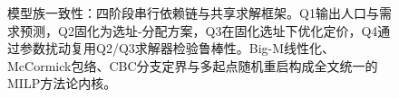 \begin{figure}[H]
{%
}
\caption{模型族一致性：四阶段串行依赖链与共享求解框架。Q1输出人口与需求预测，Q2固化为选址-分配方案，Q3在固化选址下优化定价，Q4通过参数扰动复用Q2/Q3求解器检验鲁棒性。Big-M线性化、McCormick包络、CBC分支定界与多起点随机重启构成全文统一的MILP方法论内核。}
\label{fig:model_consistency}
\end{figure}
